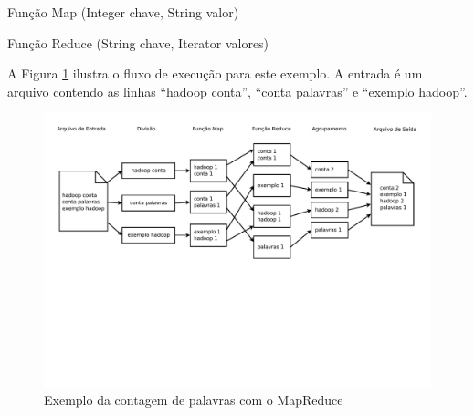 \SetAlCapSkip{0.6cm}

\begin{algorithm}	
\DontPrintSemicolon
	\caption{Função Map (Integer chave, String valor)}\label{funcaoMap}
\end{algorithm}

\begin{algorithm}	 
\DontPrintSemicolon
	\caption{Função Reduce (String chave, Iterator valores)}\label{funcaoReduce}
\end{algorithm}


A Figura \ref{fig:MapReduceexemplo} ilustra o fluxo de execução para este exemplo. A entrada é um arquivo contendo as linhas ``hadoop conta'', ``conta palavras'' e ``exemplo hadoop''.

\begin{figure}[!h]
\centering
\includegraphics[trim=0cm 9cm 0cm 0cm, width=\textwidth]{figuras/MapReduceExemplo.pdf}
\caption{Exemplo da contagem de palavras com o MapReduce}
\label{fig:MapReduceexemplo}
\end{figure}

